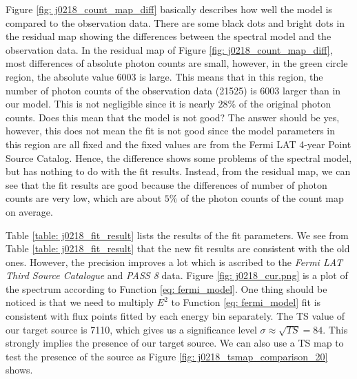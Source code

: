 \documentclass[12pt]{report}
\begin{document}
            Figure \ref{fig: j0218_count_map_diff} basically describes how well the model is 
            compared to the observation data. There are some black dots and bright dots in 
            the residual map showing the differences between the spectral model and the 
            observation data. In the residual map of Figure \ref{fig: j0218_count_map_diff}, 
            most differences of absolute photon counts are small, however, in the green 
            circle region, the absolute value 6003 is large. This means that in this region,
            the number of photon counts of the observation data (21525) is 6003 larger than 
            in our model. This is not negligible since it is nearly $28\%$ of the original 
            photon counts. Does this mean that the model is not good? The answer should be 
            yes, however, this does not mean the fit is not good since the model parameters 
            in this region are all fixed and the fixed values are from the Fermi LAT 4-year 
            Point Source Catalog. Hence, the difference shows some problems of the spectral 
            model, but has nothing to do with the fit results. Instead, from the residual map, 
            we can see that the fit results are good because the differences
            of number of photon counts are very low, which are about $5\%$ of the photon 
            counts of the count map on average.

            Table \ref{table: j0218_fit_result} lists the results of the fit parameters. 
            We see from Table \ref{table: j0218_fit_result} that the new fit results are 
            consistent with the old ones. However, the precision improves a lot which is 
            ascribed to the \textit{Fermi LAT Third Source Catalogue} and \textit{PASS 8} 
            data. Figure \ref{fig: j0218_cur.png} is a plot of the spectrum 
            according to Function \ref{eq: fermi_model}.
            One thing should be noticed is that we need to multiply $E^2$ to Function 
            \ref{eq: fermi_model} 
            fit is consistent with flux points fitted by each energy bin separately. 
            The TS value of our target source is 7110, which gives us 
            a significance level $\sigma \approx \sqrt{TS} = 84$. This strongly implies the presence of our
            target source. We can also use a TS map to test the presence of the source as Figure
            \ref{fig: j0218_tsmap_comparison_20} shows. 
            
\end{document}
